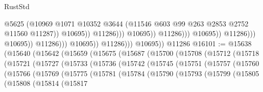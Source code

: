 \begin{lexlean}{RustStd}
\begin{coremodule}
                                                          @5625
                                                          (@10969
                                                            @1071
                                                            @10352
                                                            @3644
                                                            (@11546
                                                              @603
                                                              @99
                                                              @263
                                                              @2853
                                                              @2752
                                                              @11560
                                                              @11287))
                                                          @10695))
                                                      @11286)))
                                                @10695))
                                            @11286)))
                                      @10695))
                                  @11286)))
                            @10695))
                        @11286)))
                  @10695))
              @11286)))
        @10695))
    @11286
@16101 := @15638
    (@15640
      (@15642
        (@15659
          (@15675
            (@15687
              (@15700
                (@15708
                  (@15712
                    (@15718
                      (@15721
                        (@15727
                          (@15733
                            (@15736
                              (@15742
                                (@15745
                                  (@15751
                                    (@15757
                                      (@15760
                                        (@15766
                                          (@15769
                                            (@15775
                                              (@15781
                                                (@15784
                                                  (@15790
                                                    (@15793
                                                      (@15799
                                                        (@15805
                                                          (@15808
                                                            (@15814
                                                              (@15817

\end{coremodule}
\end{lexlean}
